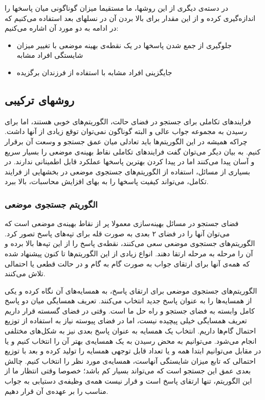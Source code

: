 \documentclass{report}
\begin{document}
در دسته‌ی دیگری از این روشها، ما مستقیما میزان گوناگونی میان پاسخها را اندازه‌گیری کرده و از این مقدار برای بالا بردن آن در نسلهای بعد استفاده می‌کنیم که در ادامه به دو مورد آن اشاره می‌کنیم:
\begin{itemize}
\item
جلوگیری از جمع شدن پاسخها در یک نقطه‌ی بهینه موضعی با تغییر میزان شایستگی افراد مشابه
\item
جایگزینی افراد مشابه با استفاده از فرزندان برگزیده
\end{itemize}

\subsection{روشهای ترکیبی}
فرایندهای تکاملی برای جستجو در فضای حالت، الگوریتم‌های خوبی هستند، اما برای رسیدن به مجموعه جواب عالی و البته گوناگون نمی‌توان توقع زیادی از آنها داشت. چراکه همیشه در این الگوریتم‌ها باید تعادلی میان عمق جستجو و وسعت آن برقرار کنیم. به بیان دیگر می‌توان گفت فرایندهای تکاملی نقاط بهینه‌ی موضعی را بسیار سریع و آسان پیدا می‌کنند اما در پیدا کردن بهترین پاسخها عملکرد قابل اطمینانی ندارند. در بسیاری از مسائل، استفاده از الگوریتم‌های جستجوی موضعی در بخشهایی از فرایند تکامل، می‌تواند کیفیت پاسخها را به بهای افزایش محاسبات، بالا ببرد.

\subsubsection{الگوریتم جستجوی موضعی}
فضای جستجو در مسائل بهینه‌سازی معمولا پر از نقاط بهینه‌ی موضعی است که می‌توان آنها را در فضای ۲ بعدی به صورت قله برای تپه‌های پاسخ تصور کرد. الگوریتم‌های جستجوی موضعی سعی می‌کنند، نقطه‌ی پاسخ را از این تپه‌ها بالا برده و آن را مرحله به مرحله ارتقا دهند. انواع زیادی از این الگوریتم‌ها تا کنون پیشنهاد شده که همه‌ی آنها برای ارتقای جواب به صورت گام به گام و در حالت قطعی یا احتمالی تلاش می‌کنند.
 
الگوریتم‌های جستجوی موضعی برای ارتقای پاسخ، به همسایه‌های آن نگاه کرده و یکی از همسایه‌ها را به عنوان پاسخ جدید انتخاب می‌کنند. تعریف همسایگی میان دو پاسخ کامل وابسته به فضای جستجو و راه حل ما است. وقتی در فضای گسسته قرار داریم تعریف همسایگی خیلی پیچیده نیست، اما در فضای پیوسته نیاز به استفاده از توزیع احتمال گام‌ها داریم. انتخاب یک همسایه به عنوان پاسخ بعدی نیز به شکل‌های مختلفی انجام می‌شود. می‌توانیم به محض رسیدن به یک همسایه‌ی بهتر آن را انتخاب کنیم و یا در مقابل می‌توانیم ابتدا همه و یا تعداد قابل توجهی همسایه را تولید کرده و بعد با توزیع احتمالی که تابع میزان شایستگی آنهاست، همسایه‌ی مورد نظر را انتخاب کنیم. چالش بعدی عمق این جستجو است که می‌تواند بسیار کم باشد؛ خصوصا وقتی انتظار ما از این الگوریتم، تنها ارتقای پاسخ است و قرار نیست همه‌ی وظیفه‌ی دستیابی به جواب مناسب را بر عهده‌ی آن قرار دهیم.
\end{document}
